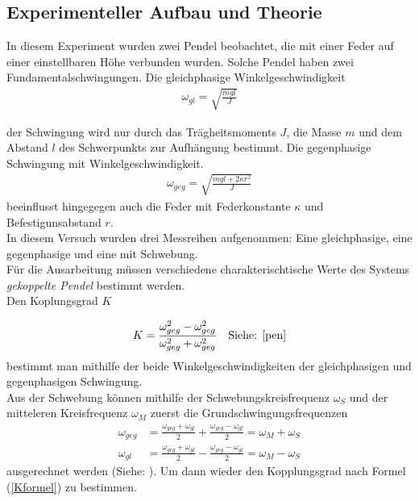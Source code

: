 \documentclass[11pt, a4paper]{article}
\begin{document}
    \subsection{Experimenteller Aufbau und Theorie}

    In diesem Experiment wurden zwei Pendel beobachtet, die mit einer Feder auf einer einstellbaren Höhe
    verbunden wurden. Solche Pendel haben zwei Fundamentalschwingungen. 
    Die gleichphasige Winkelgeschwindigkeit 
    \begin{align}
        \omega_{gl} = \sqrt{\frac{mgl}{J}}
    \end{align}
    
    der Schwingung
    wird nur durch das Trägheitsmoments $J$, die Masse $m$ und dem Abstand $l$ des Schwerpunkts zur Aufhängung bestimmt.
    Die gegenphasige Schwingung mit Winkelgeschwindigkeit. 
    \begin{align}
        \omega_{geg} = \sqrt{\frac{mgl+2\kappa r^2}{J}}
    \end{align}
    beeinflusst hingegegen auch die Feder mit Federkonstante $\kappa$ und Befestigunsabstand $r$. \\
    In diesem Versuch wurden drei Messreihen aufgenommen: Eine gleichphasige, eine gegenphasige und
    eine mit Schwebung.\\
    Für die Ausarbeitung müssen verschiedene charakterischtische Werte des Systems \textit{gekoppelte Pendel} bestimmt werden. \\

    Den Koplungsgrad $K$

    \begin{align} \label{Kformel}
        K = \frac{\omega_{geg}^2 - \omega_{geg}^2}{\omega_{geg}^2 + \omega_{geg}^2} \ \ \ \text{Siehe: \cite[Formel (35)]{pen}}
    \end{align}
     bestimmt man mithilfe der beide Winkelgeschwindigkeiten der gleichphasigen und gegenphasigen Schwingung. \\

    Aus der Schwebung können mithilfe der Schwebungskreisfrequenz $\omega_S$
    und der mitteleren Kreisfrequenz  $\omega_M$ zuerst die Grundschwingungsfrequenzen
    \begin{align}
        \omega_{geg} &= \frac{\omega_{geg} + \omega_{gl}}{2} + \frac{\omega_{geg} - \omega_{gl}}{2} = \omega_M + \omega_S \\
        \omega_{gl} &= \frac{\omega_{geg} + \omega_{gl}}{2} - \frac{\omega_{geg} - \omega_{gl}}{2} = \omega_M - \omega_S
    \end{align}
    ausgerechnet werden (Siehe: \cite[Formel (34)]{pen}). Um dann wieder den Kopplungsgrad nach Formel (\ref{Kformel})
    zu bestimmen. \\
\end{document}
